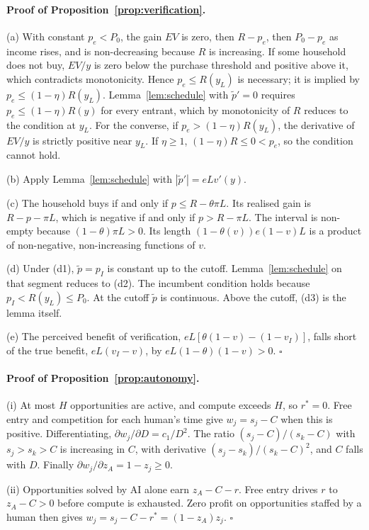 \documentclass[12pt]{article}
\theoremstyle{remark}
\begin{document}
\paragraph{Proof of Proposition~\ref{prop:verification}.}
(a) With constant $p_e<P_0$, the gain $EV$ is zero, then $R-p_e$, then $P_0-p_e$ as income rises, and is non-decreasing because $R$ is increasing. If some household does not buy, $EV/y$ is zero below the purchase threshold and positive above it, which contradicts monotonicity. Hence $p_e\le R(y_L)$ is necessary; it is implied by $p_e\le(1-\eta)R(y_L)$. Lemma~\ref{lem:schedule} with $\tilde p'=0$ requires $p_e\le(1-\eta)R(y)$ for every entrant, which by monotonicity of $R$ reduces to the condition at $y_L$. For the converse, if $p_e>(1-\eta)R(y_L)$, the derivative of $EV/y$ is strictly positive near $y_L$. If $\eta\ge1$, $(1-\eta)R\le0<p_e$, so the condition cannot hold.

(b) Apply Lemma~\ref{lem:schedule} with $|\tilde p'|=eLv'(y)$.

(c) The household buys if and only if $p\le R-\theta\pi L$. Its realised gain is $R-p-\pi L$, which is negative if and only if $p>R-\pi L$. The interval is non-empty because $(1-\theta)\pi L>0$. Its length $(1-\theta(v))e(1-v)L$ is a product of non-negative, non-increasing functions of $v$.

(d) Under (d1), $\tilde p=p_I$ is constant up to the cutoff. Lemma~\ref{lem:schedule} on that segment reduces to (d2). The incumbent condition holds because $p_I<R(y_L)\le P_0$. At the cutoff $\tilde p$ is continuous. Above the cutoff, (d3) is the lemma itself.

(e) The perceived benefit of verification, $eL[\theta(1-v)-(1-v_I)]$, falls short of the true benefit, $eL(v_I-v)$, by $eL(1-\theta)(1-v)>0$. $\square$

\paragraph{Proof of Proposition~\ref{prop:autonomy}.}
(i) At most $H$ opportunities are active, and compute exceeds $H$, so $r^*=0$. Free entry and competition for each human's time give $w_j=s_j-C$ when this is positive. Differentiating, $\partial w_j/\partial D=c_1/D^2$. The ratio $(s_j-C)/(s_k-C)$ with $s_j>s_k>C$ is increasing in $C$, with derivative $(s_j-s_k)/(s_k-C)^2$, and $C$ falls with $D$. Finally $\partial w_j/\partial z_A=1-z_j\ge0$.

(ii) Opportunities solved by AI alone earn $z_A-C-r$. Free entry drives $r$ to $z_A-C>0$ before compute is exhausted. Zero profit on opportunities staffed by a human then gives $w_j=s_j-C-r^*=(1-z_A)z_j$. $\square$
\end{document}
